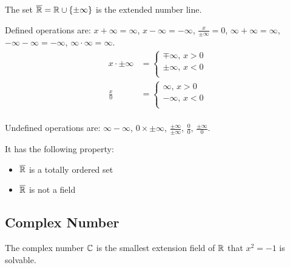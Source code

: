 \begin{definition}
    The set $\overline{\mathbb{R}} = \mathbb{R} \cup \set{\pm \infty}$ is the extended number line. 
    
    Defined operations are: $x + \infty = \infty$, $x - \infty = -\infty$, $\displaystyle \frac{x}{\pm \infty} = 0$, $\infty + \infty = \infty$, $- \infty - \infty = - \infty$, $\infty \cdot \infty = \infty$.
    \begin{equation}
        \begin{aligned}
            x \cdot \pm \infty &= \begin{cases}
                \mp \infty \text{, } x > 0 \\
                \pm \infty \text{, } x < 0 \\
            \end{cases} \\
            \frac{x}{0} &= \begin{cases}
                \infty \text{, } x > 0 \\
                -\infty \text{, } x < 0 \\
            \end{cases} \\
        \end{aligned}
    \end{equation}
    
    Undefined operations are: $\infty - \infty$, $0 \times \pm \infty$, $\displaystyle \frac{\pm \infty}{\pm \infty}$, $\displaystyle \frac{0}{0}$, $\displaystyle \frac{\pm \infty}{0}$.
    
    It has the following property:
    \begin{itemize}
        \item $\overline{\mathbb{R}}$ is a totally ordered set
        \item $\overline{\mathbb{R}}$ is not a field
    \end{itemize}
\end{definition}

\subsection{Complex Number}

The complex number $\mathbb{C}$ is the smallest extension field of $\mathbb{R}$ that $x^2 = -1$ is solvable.

